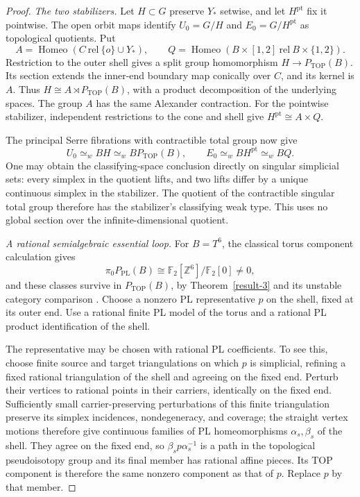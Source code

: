 \begin{proof}
\emph{The two stabilizers.}
Let $H\subset G$ preserve $Y_*$ setwise, and let $H^{\mathrm{pt}}$
fix it pointwise.  The open orbit maps identify
$U_0=G/H$ and $E_0=G/H^{\mathrm{pt}}$ as topological quotients.
Put
\[
 A=\operatorname{Homeo}(C\ \mathrm{rel}\ \{o\}\cup Y_*),
 \qquad
 Q=\operatorname{Homeo}
       (B\times[1,2]\ \mathrm{rel}\ B\times\{1,2\}).
\]
Restriction to the outer shell gives a split group homomorphism
$H\to P_{\mathrm{TOP}}(B)$.  Its section extends the inner-end
boundary map conically over $C$, and its kernel is $A$.
Thus $H\cong A\rtimes P_{\mathrm{TOP}}(B)$, with a product
decomposition of the underlying spaces.  The group $A$ has the
same Alexander contraction.  For the pointwise stabilizer,
independent restrictions to the cone and shell give
$H^{\mathrm{pt}}\cong A\times Q$.

The principal Serre fibrations with contractible total group now
give
\[
 U_0\simeq_w BH\simeq_w BP_{\mathrm{TOP}}(B),
 \qquad
 E_0\simeq_w BH^{\mathrm{pt}}\simeq_w BQ.
\]
One may obtain the classifying-space conclusion directly on
singular simplicial sets: every simplex in the quotient lifts,
and two lifts differ by a unique continuous simplex in the
stabilizer.  The quotient of the contractible singular total
group therefore has the stabilizer's classifying weak type.
This uses no global section over the infinite-dimensional
quotient.

\emph{A rational semialgebraic essential loop.}
For $B=T^6$, the classical torus component calculation gives
\[
 \pi_0P_{\mathrm{PL}}(B)
       \cong\mathbb F_2[\mathbb Z^6]/\mathbb F_2[0]\ne0,
\]
and these classes survive in $P_{\mathrm{TOP}}(B)$, by
Theorem~\ref{result-3} and its unstable category comparison
\cite[Theorems~6.1--6.2, pp.~41--43]{BurgheleaLashof1974II}.
Choose a nonzero PL representative $p$ on the shell, fixed at its
outer end.  Use a rational finite PL model of the torus and a
rational PL product identification of the shell.

The representative may be chosen with rational PL coefficients.
To see this, choose finite source and target triangulations on
which $p$ is simplicial, refining a fixed rational triangulation
of the shell and agreeing on the fixed end.  Perturb their
vertices to rational points in their carriers, identically on
the fixed end.  Sufficiently small carrier-preserving perturbations
of this finite triangulation preserve its simplex incidences,
nondegeneracy, and coverage; the straight vertex motions therefore
give continuous families of PL homeomorphisms
$\alpha_s,\beta_s$ of the shell.
They agree on the fixed end, so $\beta_s p\alpha_s^{-1}$ is a
path in the topological pseudoisotopy group and its final member
has rational affine pieces.  Its TOP component is therefore the
same nonzero component as that of $p$.  Replace $p$ by that member.


\end{proof}
